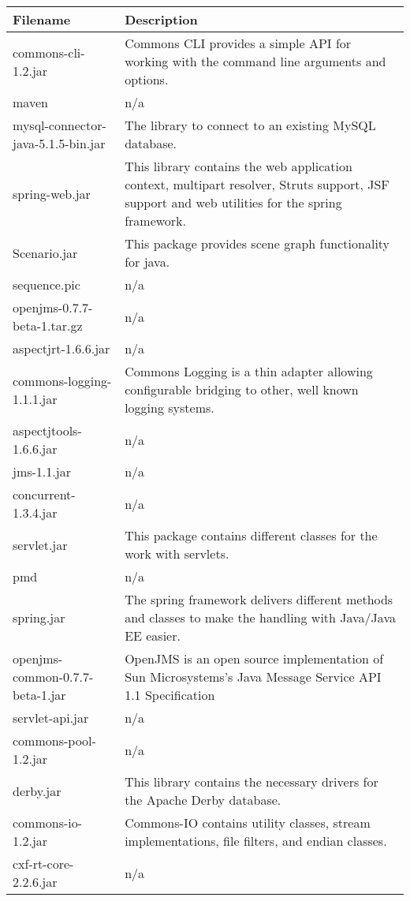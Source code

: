 \begin{center}
\begin{longtable}{|p{}|p{}|}
\hline 
Filename & Description\\
\hline
\hline 
commons-cli-1.2.jar & Commons CLI provides a simple API for working with the command line arguments and options.\\
\hline 
maven & n/a\\
\hline 
mysql-connector-java-5.1.5-bin.jar & The library to connect to an existing MySQL database.\\
\hline 
spring-web.jar & This library contains the web application context, multipart resolver, Struts support, JSF support and web utilities for the spring framework.\\
\hline 
Scenario.jar & This package provides scene graph functionality for java.\\
\hline 
sequence.pic & n/a\\
\hline 
openjms-0.7.7-beta-1.tar.gz & n/a\\
\hline 
aspectjrt-1.6.6.jar & n/a\\
\hline 
commons-logging-1.1.1.jar & Commons Logging is a thin adapter allowing configurable bridging to other, well known logging systems.\\
\hline 
aspectjtools-1.6.6.jar & n/a\\
\hline 
jms-1.1.jar & n/a\\
\hline 
concurrent-1.3.4.jar & n/a\\
\hline 
servlet.jar & This package contains different classes for the work with servlets.\\
\hline 
pmd & n/a\\
\hline 
spring.jar & The spring framework delivers different methods and classes to make the handling with Java/Java EE easier.\\
\hline 
openjms-common-0.7.7-beta-1.jar & OpenJMS is an open source implementation of Sun Microsystems's Java Message Service API 1.1 Specification\\
\hline 
servlet-api.jar & n/a\\
\hline 
commons-pool-1.2.jar & n/a\\
\hline 
derby.jar & This library contains the necessary drivers for the Apache Derby database.\\
\hline 
commons-io-1.2.jar & Commons-IO contains utility classes, stream implementations, file filters, and endian classes.\\
\hline 
cxf-rt-core-2.2.6.jar & n/a\\

\end{longtable}
\end{center}
